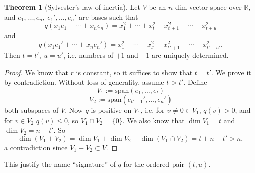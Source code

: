 \documentclass[a4paper]{article}
\newcommand{\spanset}{\text{span}}
\theoremstyle{definition}
\newtheorem{thm}[defn]{Theorem}
\begin{document}
\begin{thm}[Sylvester's law of inertia]
Let $V$ be an $n$-dim vector space over $\mathbb R$, and $e_1,\ldots,e_n,\ e_1',\ldots,e_n'$ are bases such that
\[
q(x_1e_1+\cdots+x_ne_n)=x_1^2+\cdots+x_t^2-x_{t+1}^2-\cdots-x_{t+u}^2
\]
and
\[
q(x_1e_1'+\cdots+x_ne_n')=x_1^2+\cdots+x_{t'}^2-x_{t'+1}^2-\cdots-x_{t'+u'}^2 .
\]
Then $t=t',\ u=u'$, i.e. numbers of $+1$ and $-1$ are uniquely determined.
\end{thm}
\begin{proof}
We know that $r$ is constant, so it suffices to show that $t=t'$. We prove it by contradiction. Without loss of generality, assume $t>t'$. Define
    \[
    V_1:=\spanset (e_1,\ldots,e_t)
    \]
    \[
    V_2:=\spanset \left(e_{t'+1}',\ldots,e_n'\right)
    \]
    both subspaces of $V$. Now $q$ is positive on $V_1$, i.e. for $v\neq 0\in V_1$, $q(v)>0$, and for $v\in V_2$ $q(v)\leq 0$, so $V_1 \cap V_2=\{0\}$. We also know that $\dim V_1=t$ and $\dim V_2=n-t'$. So
    \[
    \dim (V_1+V_2)= \dim V_1+\dim V_2-\dim (V_1 \cap V_2)=t+n-t'>n ,
    \]
    a contradiction since $V_1+V_2 \subset V$.
\end{proof}
This justify the name ``signature'' of $q$ for the ordered pair $(t,u)$.
\end{document}
